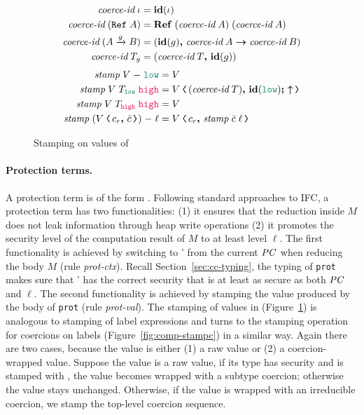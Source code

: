 \begin{figure}
  \begin{align*}
    \textit{coerce-id}\;\iota &= \mathit{\mathbf{id}}(\iota) \\
    \textit{coerce-id}\;(\mathtt{Ref}\;{A}) &= \mathbf{Ref}\;{(\textit{coerce-id}\;A)}\;{(\textit{coerce-id}\;A)} \\
    \textit{coerce-id}\;({A}\xrightarrow{{g}}{B}) &= ({\mathit{\mathbf{id}}(g)}\boldsymbol{,}\,{\textit{coerce-id}\;A}\boldsymbol{\rightarrow}{\textit{coerce-id}\;B}) \\
    \textit{coerce-id}\;T_g &= ({\textit{coerce-id}\;T}\boldsymbol{,}\,{\mathit{\mathbf{id}}(g)})
  \end{align*}
  \begin{align*}
    \mathit{stamp}\;V\;{-}\;\low &= V \\
    \mathit{stamp}\;V\;T_{\low}\;\high &= \cccast{V}{\coerc{(\textit{coerce-id}\;T)}{\id{\low} \seq \up}} \\
    \mathit{stamp}\;V\;T_{\high}\;\high &= V \\
    \mathit{stamp}\;(\cccast{V}{\coerc{c_r}{\bar{c}}})\;{-}\;\ell &= \cccast{V}{\coerc{c_r}{\mathit{stamp}\;\bar{c}\;\ell}}
  \end{align*}
  \caption{Stamping on values of \CC}
  \label{fig:stamp-val}
\end{figure}

\paragraph{Protection terms.} A protection term is of the form
. Following standard approaches to IFC, a protection
term has two functionalities: (1) it ensures that the reduction inside $M$ does
not leak information through heap write operations (2) it promotes the security
level of the computation result of $M$ to at least level $\ell$. The first
functionality is achieved by switching to \PC' from the current $\mathit{PC}$ when
reducing the body $M$ (rule \textit{prot-ctx}). Recall
Section~\ref{sec:cc-typing}, the typing of \texttt{prot} makes sure that \PC'
has the correct security that is at least as secure as both $\mathit{PC}$ and $\ell$.
The second functionality is achieved by stamping the value produced by the body
of \texttt{prot} (rule \textit{prot-val}). The stamping of values in \CC
(Figure~\ref{fig:stamp-val}) is analogous to stamping of label expressions and
turns to the stamping operation for coercions on labels
(Figure~\ref{fig:comp-stampc}) in a similar way. Again there are two cases,
because the value is either (1) a raw value or (2) a coercion-wrapped value.
Suppose the value is a raw value, if its type has \low security and is stamped
with \high, the value becomes wrapped with a subtype coercion; otherwise the
value stays unchanged. Otherwise, if the value is wrapped with an irreducible
coercion, we stamp the top-level coercion sequence.

